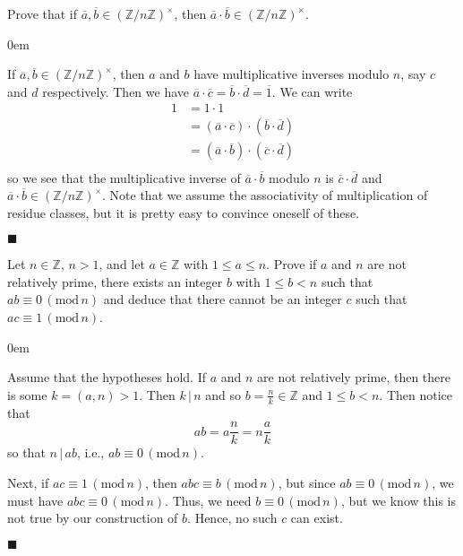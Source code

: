 \documentclass[12pt]{article}
\renewcommand{\qed}{\hfill$\blacksquare$}
\renewenvironment{proof}{\begin{addmargin}[1em]{0em}\begin{newproof}}{\end{newproof}\end{addmargin}\qed}
\newenvironment{problem}[2][Exercise]{\begin{trivlist}
\item[\hskip \labelsep {\bfseries #1}\hskip \labelsep {\bfseries #2.}]}{\end{trivlist}}
\begin{document}
\begin{problem}{0.3.11}
Prove that if $\overline{a},\overline{b} \in \left(\mathbb{Z}/n\mathbb{Z}\right)^{\times}$, then $\overline{a}\cdot \overline{b} \in \left(\mathbb{Z}/n\mathbb{Z}\right)^{\times}$.
\end{problem}
\begin{proof}
If $\overline{a},\overline{b}\in \left(\mathbb{Z}/n\mathbb{Z}\right)^{\times}$, then $a$ and $b$ have multiplicative inverses modulo $n$, say $c$ and $d$ respectively. Then we have $\overline{a}\cdot \overline{c} = \overline{b}\cdot \overline{d} = \overline{1}$. We can write 
\begin{equation}
\begin{split}
	1 & = 1 \cdot 1 \\
	& = \left(\overline{a}\cdot \overline{c}\right)\cdot \left(\overline{b}\cdot \overline{d}\right) \\
	& = \left(\overline{a}\cdot \overline{b}\right) \cdot \left(\overline{c}\cdot \overline{d}\right) \\
\end{split}
\end{equation}
so we see that the multiplicative inverse of $\overline{a}\cdot \overline{b}$ modulo $n$ is $\overline{c}\cdot \overline{d}$ and $\overline{a}\cdot \overline{b} \in \left(\mathbb{Z}/n\mathbb{Z}\right)^{\times}$. Note that we assume the associativity of multiplication of residue classes, but it is pretty easy to convince oneself of these.
\end{proof}




\begin{problem}{0.3.12}
Let $n\in\mathbb{Z}$, $n>1$, and let $a\in \mathbb{Z}$ with $1\leq a \leq n$. Prove if $a$ and $n$ are not relatively prime, there exists an integer $b$ with $1\leq b < n$ such that $ab\equiv 0 \, \left(\text{mod} \, n\right)$ and deduce that there cannot be an integer $c$ such that $ac \equiv 1 \, \left(\text{mod} \, n\right)$.
\end{problem}
\begin{proof}
Assume that the hypotheses hold. If $a$ and $n$ are not relatively prime, then there is some $k = \left(a,n\right) > 1$. Then $k\, | \, n$ and so $b= \frac{n}{k} \in \mathbb{Z}$ and $1\leq b < n$. Then notice that \[ ab = a\frac{n}{k} = n\frac{a}{k} \] so that $n \, | \, ab$, i.e., $ab \equiv 0 \, \left(\text{mod}\, n\right)$.

Next, if $ac \equiv 1 \, \left(\text{mod}\, n\right)$, then $abc \equiv b \, \left(\text{mod}\, n\right)$, but since $ab\equiv 0 \, \left(\text{mod}\, n\right)$, we must have $abc \equiv 0 \, \left(\text{mod}\, n\right)$. Thus, we need $b \equiv 0 \, \left(\text{mod}\, n\right)$, but we know this is not true by our construction of $b$. Hence, no such $c$ can exist. 
\end{proof}
\end{document}
